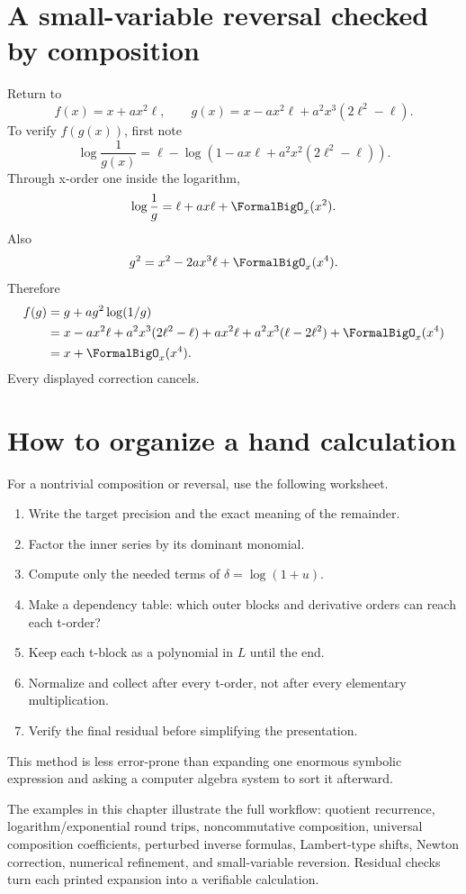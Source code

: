 \documentclass[11pt,openany]{book}
\theoremstyle{definition}
\theoremstyle{plain}
\theoremstyle{remark}
\begin{document}
\section{A small-variable reversal checked by composition}
Return to
\[
 f(x)=x+a x^2\ell,
 \qquad
 g(x)=x-a x^2\ell+a^2x^3(2\ell^2-\ell).
\]
To verify \(f(g(x))\), first note
\[
 \log\frac1{g(x)}
 =\ell-\log\left(1-a x\ell+a^2x^2(2\ell^2-\ell)\right).
\]
Through x-order one inside the logarithm,
\[
 \log\frac1g=\ell+a x\ell+\FormalBigO_x(x^2).
\]
Also
\[
 g^2=x^2-2a x^3\ell+\FormalBigO_x(x^4).
\]
Therefore
\begin{align*}
 f(g)&=g+a g^2\log(1/g)\\
 &=x-a x^2\ell+a^2x^3(2\ell^2-\ell)
   +a x^2\ell+a^2x^3(\ell-2\ell^2)
   +\FormalBigO_x(x^4)\\
 &=x+\FormalBigO_x(x^4).
\end{align*}
Every displayed correction cancels.

\section{How to organize a hand calculation}
For a nontrivial composition or reversal, use the following worksheet.
\begin{enumerate}
\item Write the target precision and the exact meaning of the remainder.
\item Factor the inner series by its dominant monomial.
\item Compute only the needed terms of \(\delta=\log(1+u)\).
\item Make a dependency table: which outer blocks and derivative orders can
      reach each t-order?
\item Keep each t-block as a polynomial in \(L\) until the end.
\item Normalize and collect after every t-order, not after every elementary
      multiplication.
\item Verify the final residual before simplifying the presentation.
\end{enumerate}
This method is less error-prone than expanding one enormous symbolic expression
and asking a computer algebra system to sort it afterward.

\begin{summarybox}
The examples in this chapter illustrate the full workflow: quotient recurrence,
logarithm/exponential round trips, noncommutative composition, universal
composition coefficients, perturbed inverse formulas, Lambert-type shifts,
Newton correction, numerical refinement, and small-variable reversion.
Residual checks turn each printed expansion into a verifiable calculation.
\end{summarybox}
\end{document}
